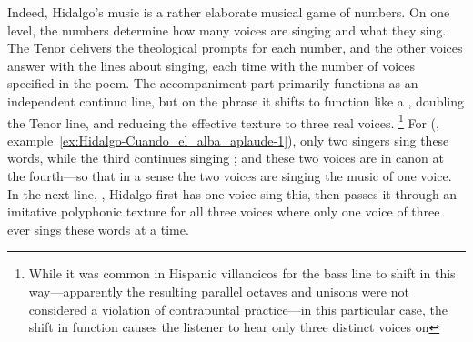 Indeed, Hidalgo's music is a rather elaborate musical game of numbers.
On one level, the numbers determine how many voices are singing and what they sing. 
The Tenor delivers the theological prompts for each number, and the other voices answer with the lines about singing, each time with the number of voices specified in the poem.
The accompaniment part primarily functions as an independent continuo line, but on the phrase  it shifts to function like a , doubling the Tenor line, and reducing the effective texture to three real voices.%
	\footnote{%
While it was common in Hispanic villancicos for the bass line to shift in this way---apparently the resulting parallel octaves and unisons were not considered a violation of contrapuntal practice---in this particular case, the shift in function causes the listener to hear only three distinct voices on 
	}
For  (, example~\ref{ex:Hidalgo-Cuando_el_alba_aplaude-1}), only two singers sing these words, while the third continues singing ; and these two voices are in canon at the fourth---so that in a sense the two voices are singing the music of one voice.
In the next line, , Hidalgo first has one voice sing this, then passes it through an imitative polyphonic texture for all three voices where only one voice of three ever sings these words at a time.

